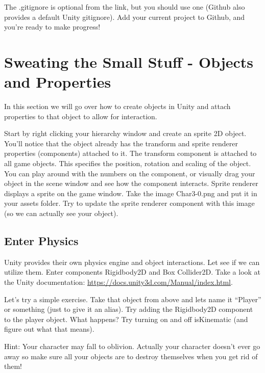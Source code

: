 \documentclass[12pt]{article}
\begin{document}
The .gitignore is optional from the link, but you should use one (Github also provides a default Unity gitignore). Add your current project to Github, and you're ready to make progress!

\newpage

\section{Sweating the Small Stuff - Objects and Properties}

In this section we will go over how to create objects in Unity and attach properties to that object to allow for interaction. 

Start by right clicking your hierarchy window and create an sprite 2D object. You'll notice that the object already has the transform and sprite renderer properties (components) attached to it. The transform component is attached to all game objects. This specifies the position, rotation and scaling of the object. You can play around with the numbers on the component, or visually drag your object in the scene window and see how the component interacts. Sprite renderer displays a sprite on the game window. Take the image Char3-0.png and put it in your assets folder. Try to update the sprite renderer component with this image (so we can actually see your object). 

\subsection{Enter Physics}

Unity provides their own physics engine and object interactions. Let see if we can utilize them. Enter components Rigidbody2D and Box Collider2D. Take a look at the Unity documentation: \url{https://docs.unity3d.com/Manual/index.html}.

Let's try a simple exercise. Take that object from above and lets name it ``Player'' or something (just to give it an alias). Try adding the Rigidbody2D component to the player object. What happens? Try turning on and off isKinematic (and figure out what that means). 

Hint: Your character may fall to oblivion. Actually your character doesn't ever go away so make sure all your objects are to destroy themselves when you get rid of them!
\end{document}
